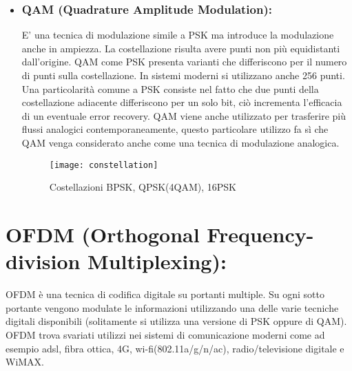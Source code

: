 \begin{itemize}
  \item \subsection{QAM (Quadrature Amplitude Modulation): } E' una tecnica di modulazione simile a PSK ma introduce la modulazione anche in ampiezza. La costellazione risulta avere punti non più equidistanti dall'origine. QAM come PSK presenta varianti che differiscono per il numero di punti sulla costellazione. In sistemi moderni si utilizzano anche 256 punti. Una particolarità comune a PSK consiste nel fatto che due punti della costellazione adiacente differiscono per un solo bit, ciò incrementa l'efficacia di un eventuale error recovery. QAM viene anche utilizzato per trasferire più flussi analogici contemporaneamente, questo particolare utilizzo fa sì che QAM venga considerato anche come una tecnica di modulazione analogica. 
  \cite{qam}
  
  \begin{figure}[h]
	\centering
	\texttt{[image: constellation]}
	\caption{Costellazioni BPSK, QPSK(4QAM), 16PSK \cite{psk-constellation}}\label{fig:1}
  \end{figure} 
  \end{itemize}
\newpage

\chapter{OFDM (Orthogonal Frequency-division Multiplexing): }
OFDM è una tecnica di codifica digitale su portanti multiple. Su ogni sotto portante vengono modulate le informazioni utilizzando una delle varie tecniche digitali disponibili (solitamente si utilizza una versione di PSK oppure di QAM). OFDM trova svariati utilizzi nei sistemi di comunicazione moderni come ad esempio adsl, fibra ottica, 4G, wi-fi(802.11a/g/n/ac), radio/televisione digitale e WiMAX.
\cite{ofdm}
\cite{ofdm2}

\label{sec:problem}
